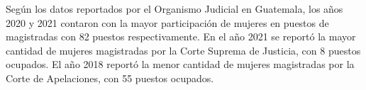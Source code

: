 Según los datos reportados por el Organismo Judicial en Guatemala, los años 2020 y 2021 contaron con la mayor participación de mujeres en puestos de magistradas con 82 puestos respectivamente. En el año 2021 se reportó la mayor cantidad de mujeres magistradas por la Corte Suprema de Justicia, con 8 puestos ocupados. El año 2018 reportó la menor cantidad de mujeres magistradas por la Corte de Apelaciones, con 55 puestos ocupados. 